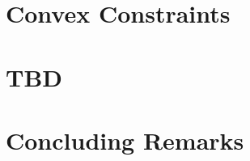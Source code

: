 \documentclass[11pt,letterpaper]{thesis2}
\begin{document}
\chapter{Convex Constraints}\label{chap:convex}

\chapter{TBD}\label{chap:tbd}

\chapter{Concluding Remarks}\label{chap:conclusion}


% 





% 

% 
\end{document}
